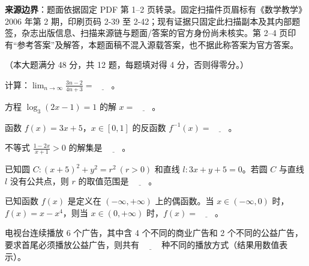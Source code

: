 

\begin{gktip}
\textbf{来源边界}：题面依据固定 PDF 第 1–2 页转录。固定扫描件页眉标有《数学教学》2006 年第 2 期，印刷页码 2-39 至 2-42；现有证据只固定此扫描副本及其内部题签，杂志出版信息、扫描来源链与题面/答案的官方身份尚未核实。第 2–4 页印有“参考答案”及解答，本题面稿不混入源载答案，也不据此称答案为官方答案。
\end{gktip}


（本大题满分 48 分，共 12 题，每题填对得 4 分，否则得零分。）

\begin{question}
计算：$\displaystyle\lim_{n\to\infty}\frac{3n-2}{4n+3}=\underline{\qquad}$。

\end{question}
\begin{question}
方程 $\log_3(2x-1)=1$ 的解 $x=\underline{\qquad}$。

\end{question}
\begin{question}
函数 $f(x)=3x+5$，$x\in[0,1]$ 的反函数 $f^{-1}(x)=\underline{\qquad}$。

\end{question}
\begin{question}
不等式 $\displaystyle\frac{1-2x}{x+1}>0$ 的解集是 $\underline{\qquad}$。

\end{question}
\begin{question}
已知圆 $C:(x+5)^2+y^2=r^2\ (r>0)$ 和直线 $l:3x+y+5=0$。若圆 $C$ 与直线 $l$ 没有公共点，则 $r$ 的取值范围是 $\underline{\qquad}$。

\end{question}
\begin{question}
已知函数 $f(x)$ 是定义在 $(-\infty,+\infty)$ 上的偶函数。当 $x\in(-\infty,0)$ 时，$f(x)=x-x^4$，则当 $x\in(0,+\infty)$ 时，$f(x)=\underline{\qquad}$。

\end{question}
\begin{question}
电视台连续播放 6 个广告，其中含 4 个不同的商业广告和 2 个不同的公益广告，要求首尾必须播放公益广告，则共有 $\underline{\qquad}$ 种不同的播放方式（结果用数值表示）。

\end{question}
